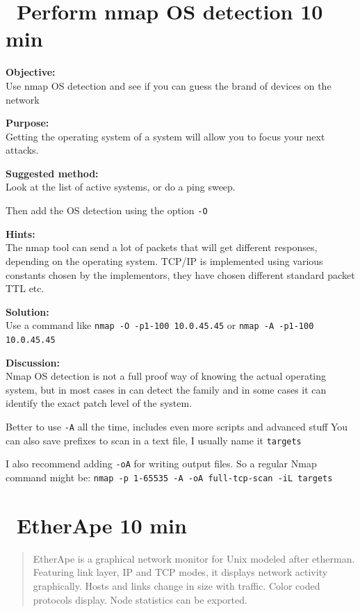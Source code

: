 \documentclass[a4paper,11pt,notitlepage]{report}
\begin{document}
\chapter{\faExclamationTriangle\ Perform nmap OS detection 10 min}
\label{ex:nmap-os}

{\bf Objective:} \\
Use nmap OS detection and see if you can guess the brand of devices on the network

{\bf Purpose:}\\
Getting the operating system of a system will allow you to focus your next attacks.

{\bf Suggested method:}\\
Look at the list of active systems, or do a ping sweep.

Then add the OS detection using the option \verb+-O+



{\bf Hints:} \\
The nmap tool can send a lot of packets that will get different responses, depending on the operating system. TCP/IP is implemented using various constants chosen by the implementors, they have chosen different standard packet TTL etc.

{\bf Solution:}\\
Use a command like \verb+nmap -O -p1-100 10.0.45.45+ or  \verb+nmap -A -p1-100 10.0.45.45+


{\bf Discussion:}\\
Nmap OS detection is not a full proof way of knowing the actual operating system, but in most cases in can detect the family and in some cases it can identify the exact patch level of the system.

Better to use \verb+-A+ all the time, includes even more scripts and advanced stuff
You can also save prefixes to scan in a text file, I usually name it \verb+targets+

I also recommend adding \verb+-oA+ for writing output files. So a regular Nmap command might be:
\verb+nmap -p 1-65535 -A -oA full-tcp-scan -iL targets+


\chapter{\faInfoCircle\ EtherApe 10 min}
\label{ex:etherape}


\begin{quote}
EtherApe is a graphical network monitor for Unix modeled after etherman. Featuring link layer, IP and TCP modes, it displays network activity graphically. Hosts and links change in size with traffic. Color coded protocols display.
Node statistics can be exported.
\end{quote}
\end{document}
